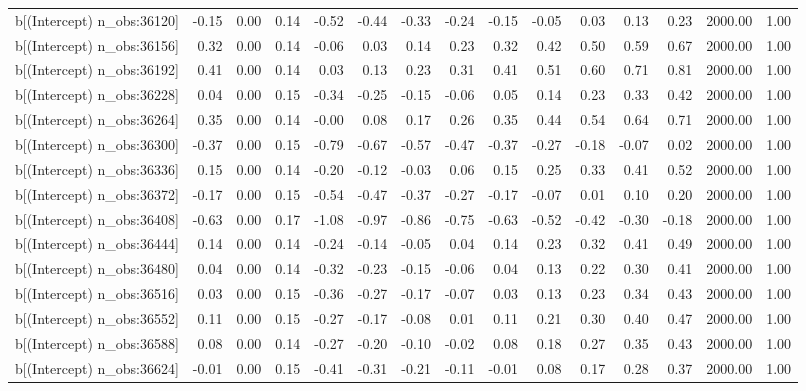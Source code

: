 \begin{table}[ht]
\begin{tabular}{rrrrrrrrrrrrrrr}
  b[(Intercept) n\_obs:36120] & -0.15 & 0.00 & 0.14 & -0.52 & -0.44 & -0.33 & -0.24 & -0.15 & -0.05 & 0.03 & 0.13 & 0.23 & 2000.00 & 1.00 \\ 
  b[(Intercept) n\_obs:36156] & 0.32 & 0.00 & 0.14 & -0.06 & 0.03 & 0.14 & 0.23 & 0.32 & 0.42 & 0.50 & 0.59 & 0.67 & 2000.00 & 1.00 \\ 
  b[(Intercept) n\_obs:36192] & 0.41 & 0.00 & 0.14 & 0.03 & 0.13 & 0.23 & 0.31 & 0.41 & 0.51 & 0.60 & 0.71 & 0.81 & 2000.00 & 1.00 \\ 
  b[(Intercept) n\_obs:36228] & 0.04 & 0.00 & 0.15 & -0.34 & -0.25 & -0.15 & -0.06 & 0.05 & 0.14 & 0.23 & 0.33 & 0.42 & 2000.00 & 1.00 \\ 
  b[(Intercept) n\_obs:36264] & 0.35 & 0.00 & 0.14 & -0.00 & 0.08 & 0.17 & 0.26 & 0.35 & 0.44 & 0.54 & 0.64 & 0.71 & 2000.00 & 1.00 \\ 
  b[(Intercept) n\_obs:36300] & -0.37 & 0.00 & 0.15 & -0.79 & -0.67 & -0.57 & -0.47 & -0.37 & -0.27 & -0.18 & -0.07 & 0.02 & 2000.00 & 1.00 \\ 
  b[(Intercept) n\_obs:36336] & 0.15 & 0.00 & 0.14 & -0.20 & -0.12 & -0.03 & 0.06 & 0.15 & 0.25 & 0.33 & 0.41 & 0.52 & 2000.00 & 1.00 \\ 
  b[(Intercept) n\_obs:36372] & -0.17 & 0.00 & 0.15 & -0.54 & -0.47 & -0.37 & -0.27 & -0.17 & -0.07 & 0.01 & 0.10 & 0.20 & 2000.00 & 1.00 \\ 
  b[(Intercept) n\_obs:36408] & -0.63 & 0.00 & 0.17 & -1.08 & -0.97 & -0.86 & -0.75 & -0.63 & -0.52 & -0.42 & -0.30 & -0.18 & 2000.00 & 1.00 \\ 
  b[(Intercept) n\_obs:36444] & 0.14 & 0.00 & 0.14 & -0.24 & -0.14 & -0.05 & 0.04 & 0.14 & 0.23 & 0.32 & 0.41 & 0.49 & 2000.00 & 1.00 \\ 
  b[(Intercept) n\_obs:36480] & 0.04 & 0.00 & 0.14 & -0.32 & -0.23 & -0.15 & -0.06 & 0.04 & 0.13 & 0.22 & 0.30 & 0.41 & 2000.00 & 1.00 \\ 
  b[(Intercept) n\_obs:36516] & 0.03 & 0.00 & 0.15 & -0.36 & -0.27 & -0.17 & -0.07 & 0.03 & 0.13 & 0.23 & 0.34 & 0.43 & 2000.00 & 1.00 \\ 
  b[(Intercept) n\_obs:36552] & 0.11 & 0.00 & 0.15 & -0.27 & -0.17 & -0.08 & 0.01 & 0.11 & 0.21 & 0.30 & 0.40 & 0.47 & 2000.00 & 1.00 \\ 
  b[(Intercept) n\_obs:36588] & 0.08 & 0.00 & 0.14 & -0.27 & -0.20 & -0.10 & -0.02 & 0.08 & 0.18 & 0.27 & 0.35 & 0.43 & 2000.00 & 1.00 \\ 
  b[(Intercept) n\_obs:36624] & -0.01 & 0.00 & 0.15 & -0.41 & -0.31 & -0.21 & -0.11 & -0.01 & 0.08 & 0.17 & 0.28 & 0.37 & 2000.00 & 1.00 \\ 

\end{tabular}
\end{table}
